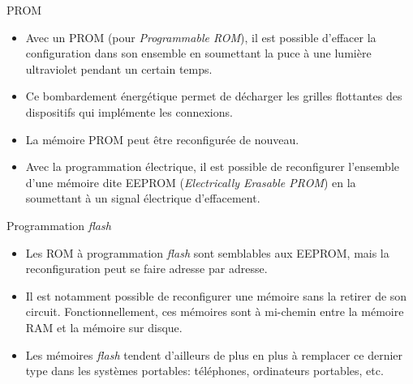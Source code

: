\documentclass[presentation]{beamer}
\begin{document}
\begin{frame}[label={sec:orgb48e8eb}]{PROM}
\begin{itemize}
\item Avec un \alert{PROM} (pour \emph{Programmable ROM}), il est possible d'effacer la configuration dans son ensemble en soumettant la puce à une lumière ultraviolet pendant un certain temps.

\item Ce bombardement énergétique permet de décharger les grilles flottantes des dispositifs qui implémente les connexions.

\item La mémoire PROM peut être reconfigurée de nouveau.

\item Avec la \alert{programmation électrique}, il est possible de reconfigurer l'ensemble d'une mémoire dite EEPROM (\emph{Electrically Erasable PROM}) en la soumettant à un signal électrique d'effacement.
\end{itemize}
\end{frame}

\begin{frame}[label={sec:orgdcf80ba}]{Programmation \emph{flash}}
\begin{itemize}
\item Les ROM à \alert{programmation \emph{flash}} sont semblables aux EEPROM, mais la reconfiguration peut se faire adresse par adresse.

\item Il est notamment possible de reconfigurer une mémoire sans la retirer de son circuit.  Fonctionnellement, ces mémoires sont à mi-chemin entre la mémoire RAM et la mémoire sur disque.

\item Les mémoires \emph{flash} tendent d'ailleurs de plus en plus à remplacer ce dernier type dans les systèmes portables: téléphones, ordinateurs portables, etc.
\end{itemize}
\end{frame}
\end{document}

